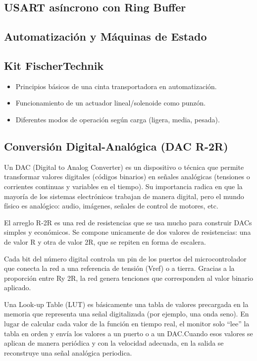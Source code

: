 \subsection{USART asíncrono con Ring Buffer}

\subsection{Automatización y Máquinas de Estado}

\subsection{Kit FischerTechnik}

\begin{itemize}
    \item Principios básicos de una cinta transportadora en automatización.
    \item Funcionamiento de un actuador lineal/solenoide como punzón.
    \item Diferentes modos de operación según carga (ligera, media, pesada).
\end{itemize}


\subsection{Conversión Digital-Analógica (DAC R-2R)}
Un DAC (Digital to Analog Converter) es un dispositivo o técnica que permite transformar valores digitales (códigos binarios) en señales analógicas (tensiones o corrientes continuas y variables en el tiempo). Su importancia radica en que la mayoría de los sistemas electrónicos trabajan de manera digital, pero el mundo físico es analógico: audio, imágenes, señales de control de motores, etc.

El arreglo R-2R es una red de resistencias que se usa mucho para construir DACs simples y económicos. Se compone unicamente de dos valores de resistencias: una de valor R y otra de valor 2R, que se repiten en forma de escalera.

Cada bit del número digital controla un pin de los puertos del microcontrolador que conecta la red a una referencia de tensión (Vref) o a tierra. Gracias a la proporción entre Ry 2R, la red genera tenciones que corresponden al valor binario aplicado.

Una Look-up Table (LUT) es básicamente una tabla de valores precargada en la memoria que representa una señal digitalizada (por ejemplo, una onda seno). En lugar de calcular cada valor de la función en tiempo real, el monitor solo ``lee'' la tabla en orden y envía los valores a un puerto o a un DAC.Cuando esos valores se aplican de manera periódica y con la velocidad adecuada, en la salida se reconstruye una señal analógica periodica.
    


